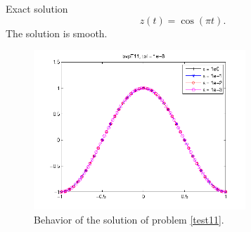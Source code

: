 \documentclass[<options>]{article}
\begin{document}
\textrm{Exact solution}
$$z(t) = \cos(\pi t).$$
The solution is smooth.

\begin{figure}[htb]
\centerline{\includegraphics[height=6cm]{Prob11}}
\caption{Behavior of the solution of problem \ref{test11}.}
\end{figure}
\newpage
\end{document}
